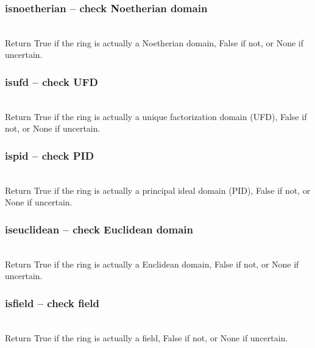   \subsubsection{isnoetherian -- check Noetherian domain}
   \\
   \spacing
   \quad Return True if the ring is actually a Noetherian
        domain, False if not, or None if uncertain.\\
   \spacing
  \subsubsection{isufd -- check UFD}
   \\
   \spacing
   \quad Return True if the ring is actually a unique
        factorization domain (UFD), False if not, or None if uncertain.\\
   \spacing
  \subsubsection{ispid -- check PID}
   \\
   \spacing
   \quad Return True if the ring is actually a principal
        ideal domain (PID), False if not, or None if uncertain.\\
   \spacing
  \subsubsection{iseuclidean -- check Euclidean domain}
   \\
   \spacing
   \quad Return True if the ring is actually a Euclidean
        domain, False if not, or None if uncertain.\\
   \spacing
  \subsubsection{isfield -- check field}
   \\
   \spacing
   \quad Return True if the ring is actually a field,
        False if not, or None if uncertain.\\
   \spacing
